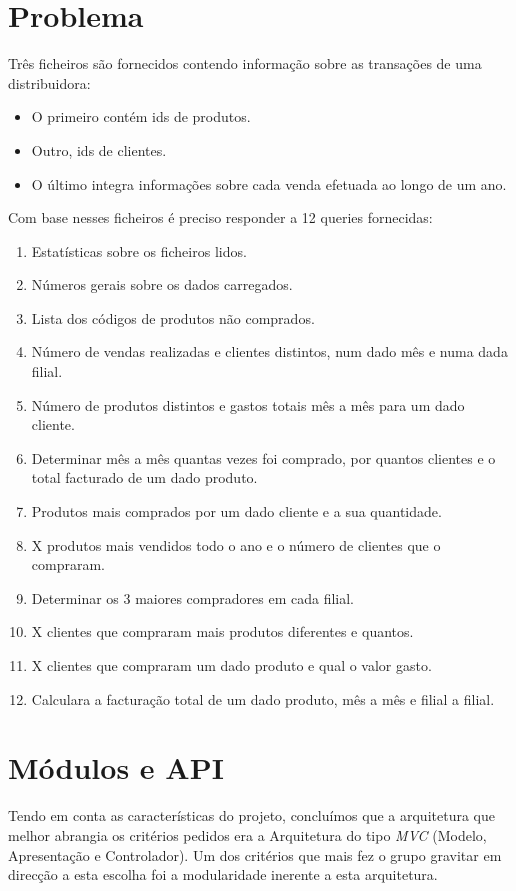 \documentclass[a4paper]{report}
\begin{document}
\chapter{Problema}
Três ficheiros são fornecidos contendo informação sobre as transações de uma distribuidora:
\begin{itemize}
    \item O primeiro contém ids de produtos.
    \item Outro, ids de clientes.
    \item O último integra informações sobre cada venda efetuada ao longo de um ano. 
\end{itemize}
Com base nesses ficheiros é preciso responder a 12 queries fornecidas:
\begin{enumerate}
    \item Estatísticas sobre os ficheiros lidos.
    \item Números gerais sobre os dados carregados.
    \item Lista dos códigos de produtos não comprados.
    \item Número de vendas realizadas e clientes distintos, num dado mês e numa dada filial.
    \item Número de produtos distintos e gastos totais mês a mês para um dado cliente.
    \item Determinar mês a mês quantas vezes foi comprado, por quantos clientes e o total facturado de um dado produto.
    \item Produtos mais comprados por um dado cliente e a sua quantidade.
    \item X produtos mais vendidos todo o ano e o número de clientes que o compraram.
    \item Determinar os 3 maiores compradores em cada filial.
    \item X clientes que compraram mais produtos diferentes e quantos.
    \item X clientes que compraram um dado produto e qual o valor gasto.
    \item Calculara a facturação total de um dado produto, mês a mês e filial a filial.
\end{enumerate}

\chapter{Módulos e API}\label{chap:api}

Tendo em conta as características do projeto, concluímos que a arquitetura que melhor
abrangia os critérios pedidos era a Arquitetura do tipo \textit{MVC} (Modelo, 
Apresentação e Controlador).
Um dos critérios que mais fez o grupo gravitar em direcção a esta escolha foi 
a modularidade inerente a esta arquitetura.
\end{document}
